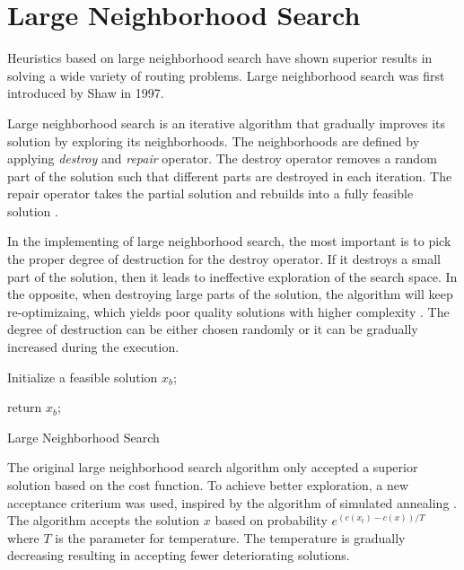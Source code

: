 \section{Large Neighborhood Search}\label{lns}
Heuristics based on large neighborhood search have shown superior results in solving a wide variety of routing problems. Large neighborhood search was first introduced by Shaw \cite{shaw-lns} in 1997.

Large neighborhood search is an iterative algorithm that gradually improves its solution by exploring its neighborhoods. The neighborhoods are defined by applying \emph{destroy} and \emph{repair} operator. The destroy operator removes a random part of the solution such that different parts are destroyed in each iteration. The repair operator takes the partial solution and rebuilds into a fully feasible solution \cite{lns}.

In the implementing of large neighborhood search, the most important is to pick the proper degree of destruction for the destroy operator. If it destroys a small part of the solution, then it leads to ineffective exploration of the search space. In the opposite, when destroying large parts of the solution, the algorithm will keep re-optimizaing, which yields poor quality solutions with higher complexity \cite{lns}. The degree of destruction can be either chosen randomly or it can be gradually increased during the execution.\newline

\begin{algorithm}[H]
    \SetAlgoLined
    Initialize a feasible solution $x_b$;
    
        return $x_b$;
    \caption{Large Neighborhood Search}
\end{algorithm}

The original large neighborhood search algorithm only accepted a superior solution based on the cost function. To achieve better exploration, a new acceptance criterium was used, inspired by the algorithm of simulated annealing \cite{lns-anneling}. The algorithm accepts the solution $x$ based on probability $e^{(c(x_t) - c(x))/T}$ where $T$ is the parameter for temperature. The temperature is gradually decreasing resulting in accepting fewer deteriorating solutions.

